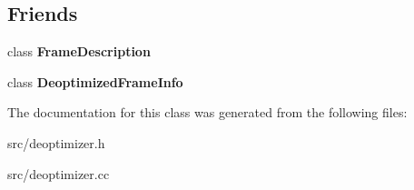 \subsection*{Friends}
\begin{DoxyCompactItemize}
\item 
\hypertarget{classv8_1_1internal_1_1_deoptimizer_a224be72dc184a8c14bfe381aba312774}{}class {\bfseries Frame\+Description}\label{classv8_1_1internal_1_1_deoptimizer_a224be72dc184a8c14bfe381aba312774}

\item 
\hypertarget{classv8_1_1internal_1_1_deoptimizer_ad768f50809f35947f37316cdfe284e92}{}class {\bfseries Deoptimized\+Frame\+Info}\label{classv8_1_1internal_1_1_deoptimizer_ad768f50809f35947f37316cdfe284e92}

\end{DoxyCompactItemize}


The documentation for this class was generated from the following files\+:\begin{DoxyCompactItemize}
\item 
src/deoptimizer.\+h\item 
src/deoptimizer.\+cc\end{DoxyCompactItemize}
